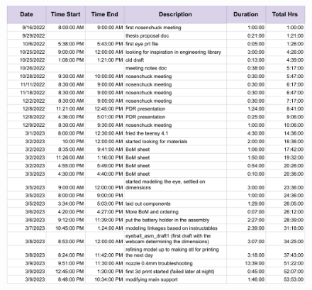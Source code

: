 \begin{figure}[h]
    \centering
    \includegraphics[page=3,width=\linewidth]{Thesis/appendix/Worklog for Writeup - Sheet1.pdf}
    \label{fig:worklog-3}
\end{figure}
